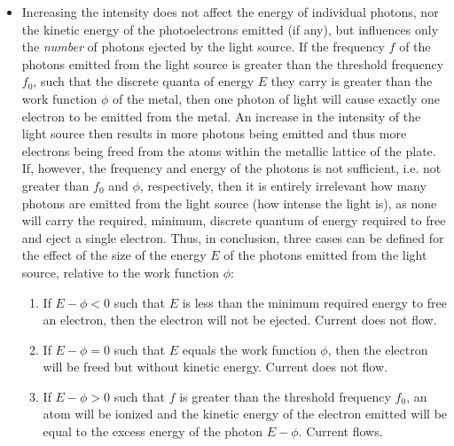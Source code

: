 \begin{itemize}
	\item Increasing the intensity does not affect the energy of individual photons, nor the kinetic energy of the photoelectrons emitted (if any), but influences only the \emph{number} of photons ejected by the light source. If the frequency $f$ of the photons emitted from the light source is greater than the threshold frequency $f_0$, such that the discrete quanta of energy $E$ they carry is greater than the work function $\phi$ of the metal, then one photon of light will cause exactly one electron to be emitted from the metal. An increase in the intensity of the light source then results in more photons being emitted and thus more electrons being freed from the atoms within the metallic lattice of the plate. If, however, the frequency and energy of the photons is not sufficient, i.e. not greater than $f_0$ and $\phi$, respectively, then it is entirely irrelevant how many photons are emitted from the light source (how intense the light is), as none will carry the required, minimum, discrete quantum of energy required to free and eject a single electron. Thus, in conclusion, three cases can be defined for the effect of the size of the energy $E$ of the photons emitted from the light source, relative to the work function $\phi$:

	\begin{enumerate}

		\item If $E - \phi < 0$ such that $E$ is less than the minimum required energy to free an electron, then the electron will not be ejected. Current does not flow.

		\item If $E - \phi = 0$ such that $E$ equals the work function $\phi$, then the electron will be freed but without kinetic energy. Current does not flow.

		\item If $E - \phi > 0$ such that $f$ is greater than the threshold frequency $f_0$, an atom will be ionized and the kinetic energy of the electron emitted will be equal to the excess energy of the photon $E - \phi$. Current flows.

	\end{enumerate}

\end{itemize}

